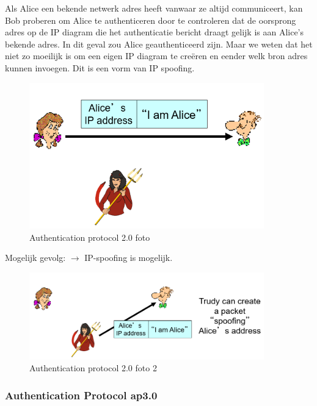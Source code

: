 \noindent Als Alice een bekende netwerk adres heeft vanwaar ze altijd communiceert, kan Bob proberen om Alice te authenticeren door te controleren dat de oorsprong adres op de IP diagram die het authenticatie bericht draagt gelijk is aan Alice’s bekende adres. In dit geval zou Alice geauthenticeerd zijn.
Maar we weten dat het niet zo moeilijk is om een eigen IP diagram te creëren en eender welk bron adres kunnen invoegen. Dit is een vorm van IP spoofing.
\begin{figure}[h]
    \centering
    \includegraphics[width=4in]{./img/imghfdst8/hfdst8puntje14.png}
    \caption{Authentication protocol 2.0 foto  }     
    \label{fig:Authentication protocol 2.0 foto 1}
\end{figure}

\noindent Mogelijk gevolg: $\rightarrow$ IP-spoofing is mogelijk.

\begin{figure}[h]
    \centering
    \includegraphics[width=4in]{./img/imghfdst8/hfdst8puntje15.png}
    \caption{Authentication protocol 2.0 foto 2}      
    \label{fig:Authentication protocol 2.0 foto 2}
\end{figure}

\subsubsection{Authentication Protocol ap3.0}

